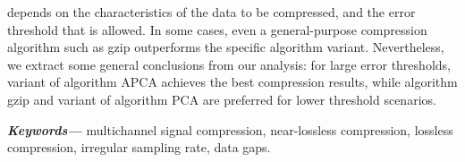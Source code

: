 {depends on the characteristics of the data to be compressed, and the error threshold that is allowed. In some cases, even a general-purpose compression algorithm such as gzip outperforms the specific algorithm variant. Nevertheless, we extract some general conclusions from our analysis: for large error thresholds, variant \maskalgo of algorithm APCA achieves the best compression results, while algorithm gzip and variant \maskalgo of algorithm PCA are preferred for lower threshold scenarios.

\textbf{\textit{Keywords---}} multichannel signal compression, near-lossless compression, lossless compression, irregular sampling rate, data gaps.

}
\clearpage
